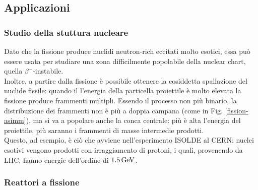 \subsection{Applicazioni}

\subsubsection{Studio della stuttura nucleare}

Dato che la fissione produce nuclidi neutron-rich eccitati molto esotici, essa può essere usata per studiare una zona difficilmente popolabile della nuclear chart, quella $ \beta^- $-instabile.\\
Inoltre, a partire dalla fissione è possibile ottenere la cosiddetta spallazione del nuclide fissile: quando il l'energia della particella proiettile è molto elevata la fissione produce frammenti multipli. Essendo il processo non più binario, la distribuzione dei frammenti non è più a doppia campana (come in Fig. \ref{fission-asimm}), ma si va a popolare anche la conca centrale: più è alta l'energia del proiettile, più saranno i frammenti di masse intermedie prodotti.\\
Questo, ad esempio, è ciò che avviene nell'esperimento ISOLDE al CERN: nuclei esotivi vengono prodotti con irraggiamento di protoni, i quali, provenendo da LHC, hanno energie dell'ordine di $ 1.5\,\text{GeV} $.

\subsubsection{Reattori a fissione}

